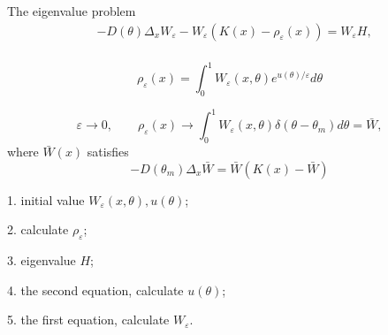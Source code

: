 \documentclass[preprint]{elsarticle}
\numberwithin{equation}{section}
\begin{document}
The eigenvalue problem
\begin{equation}
\begin{aligned}
&-D(\theta)\Delta_x W_\varepsilon - W_\varepsilon (K(x)-\rho_\varepsilon(x)) = W_\varepsilon H,\\
\end{aligned}
\end{equation}

\begin{equation}
\rho_\varepsilon(x) = \int_0^1 W_\varepsilon(x,\theta) e^{u(\theta)/\varepsilon} d\theta
\end{equation}

\begin{equation}
\varepsilon \to 0, \qquad \rho_\varepsilon(x) \to \int_0^1 W_\varepsilon(x,\theta) \delta(\theta-\theta_m) d\theta = \bar{W},
\end{equation}
where $\bar{W}(x)$ satisfies
$$-D(\theta_m) \Delta_x \bar{W}=\bar{W}(K(x)-\bar{W})$$

1. initial value $W_\varepsilon(x,\theta), u(\theta)$;

2. calculate $\rho_\varepsilon$;

3. eigenvalue $H$;

4. the second equation, calculate $u(\theta)$;

5. the first equation, calculate $W_\varepsilon$.

\newpage
\end{document}
